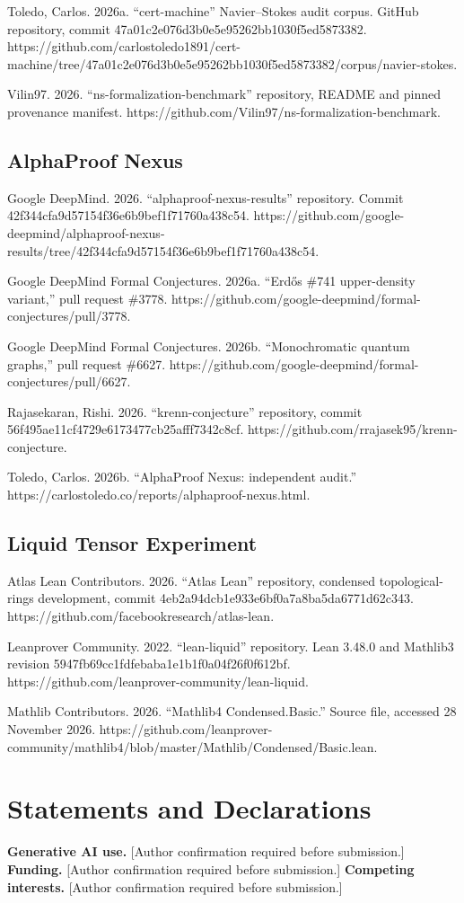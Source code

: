 \documentclass[sn-apa]{sn-jnl}
\begin{document}
Toledo, Carlos. 2026a. “cert-machine” Navier–Stokes audit corpus. GitHub repository, commit 47a01c2e076d3b0e5e95262bb1030f5ed5873382. https://github.com/carlostoledo1891/cert-machine/tree/47a01c2e076d3b0e5e95262bb1030f5ed5873382/corpus/navier-stokes.

Vilin97. 2026. “ns-formalization-benchmark” repository, README and pinned provenance manifest. https://github.com/Vilin97/ns-formalization-benchmark.

\subsection{AlphaProof Nexus}

Google DeepMind. 2026. “alphaproof-nexus-results” repository. Commit 42f344cfa9d57154f36e6b9bef1f71760a438c54. https://github.com/google-deepmind/alphaproof-nexus-results/tree/42f344cfa9d57154f36e6b9bef1f71760a438c54.

Google DeepMind Formal Conjectures. 2026a. “Erdős \#741 upper-density variant,” pull request \#3778. https://github.com/google-deepmind/formal-conjectures/pull/3778.

Google DeepMind Formal Conjectures. 2026b. “Monochromatic quantum graphs,” pull request \#6627. https://github.com/google-deepmind/formal-conjectures/pull/6627.

Rajasekaran, Rishi. 2026. “krenn-conjecture” repository, commit 56f495ae11cf4729e6173477cb25afff7342c8cf. https://github.com/rrajasek95/krenn-conjecture.

Toledo, Carlos. 2026b. “AlphaProof Nexus: independent audit.” https://carlostoledo.co/reports/alphaproof-nexus.html.

\subsection{Liquid Tensor Experiment}

Atlas Lean Contributors. 2026. “Atlas Lean” repository, condensed topological-rings development, commit 4eb2a94dcb1e933e6bf0a7a8ba5da6771d62c343. https://github.com/facebookresearch/atlas-lean.

Leanprover Community. 2022. “lean-liquid” repository. Lean 3.48.0 and Mathlib3 revision 5947fb69cc1fdfebaba1e1b1f0a04f26f0f612bf. https://github.com/leanprover-community/lean-liquid.

Mathlib Contributors. 2026. “Mathlib4 Condensed.Basic.” Source file, accessed 28 November 2026. https://github.com/leanprover-community/mathlib4/blob/master/Mathlib/Condensed/Basic.lean.

\section*{Statements and Declarations}
\textbf{Generative AI use.} [Author confirmation required before submission.]
\textbf{Funding.} [Author confirmation required before submission.]
\textbf{Competing interests.} [Author confirmation required before submission.]
\end{document}

